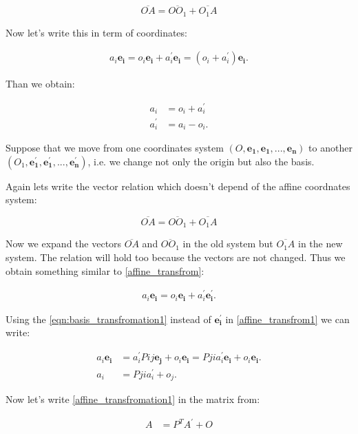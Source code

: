 \documentclass{book}
\begin{document}
\[\overline{OA} = \overline{OO_1} + \overline{O_1A}\]

Now let's write this in term of coordinates:

\begin{align}
a_i\boldsymbol{e_i} = o_i\boldsymbol{e_i} + a^{'}_i\boldsymbol{e_i} = (o_i + a^{'}_i)\boldsymbol{e_i}.\label{affine_transfrom}
\end{align}

Than we obtain:

\begin{align}
a_i &= o_i + a^{'}_i \label{affine_origin_move} \\
a^{'}_i &= a_i - o_i. \label{affine_origin_move1}
\end{align}

Suppose that we move from one coordinates system $(O, \boldsymbol{e_1}, \boldsymbol{e_1}, ..., \boldsymbol{e_n})$ to another $(O_1, \boldsymbol{e^{'}_1}, \boldsymbol{e^{'}_1}, ..., \boldsymbol{e^{'}_n})$, i.e. we change not only the origin but also the basis.

Again lets write the vector relation which doesn't depend of the affine coordnates system:

\[\overline{OA} = \overline{OO_1} + \overline{O_1A}\]

Now we expand the vectors $\overline{OA}$ and $\overline{OO_1}$ in the old system but $\overline{O_1A}$ in the new system. The relation will hold too because the vectors are not changed. Thus we obtain something similar to \eqref{affine_transfrom}:

\begin{align}
a_i\boldsymbol{e_i} = o_i\boldsymbol{e_i} + a^{'}_i\boldsymbol{e^{'}_i} \label{affine_transfrom1}.
\end{align}


Using the \eqref{eqn:basis_transfromation1} instead of $\boldsymbol{e^{'}_i}$ in \eqref{affine_transfrom1} we can write:

\begin{align}
a_i\boldsymbol{e_i} &= a^{'}_{i}P{ij}\boldsymbol{e_j} + o_i\boldsymbol{e_i} = P{ji}a^{'}_{i}\boldsymbol{e_i} + o_i\boldsymbol{e_i} \label{affine_transfrom2}.\\
a_i &= Pjia^{'}_i + o_j. \label{affine_transfromation1}
\end{align}

Now let's write \eqref{affine_transfromation1} in the matrix from:

\begin{align}
A &= P^{T}A^{'} + O \\
\end{align}
\end{document}
